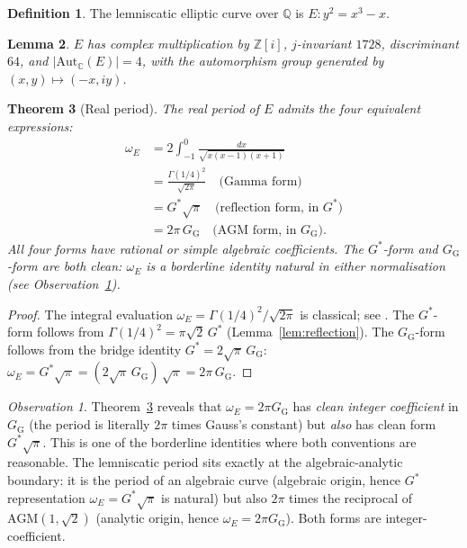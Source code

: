 \documentclass[11pt]{article}
\newtheorem{theorem}{Theorem}[section]
\newtheorem{lemma}[theorem]{Lemma}
\theoremstyle{definition}
\newtheorem{definition}[theorem]{Definition}
\theoremstyle{remark}
\newtheorem*{observation}{Observation}
\newcommand{\Gs}{G^{*}}
\newcommand{\GG}{G_{\!\scriptscriptstyle\mathrm{G}}}
\newcommand{\Z}{\mathbb{Z}}
\newcommand{\Q}{\mathbb{Q}}
\newcommand{\C}{\mathbb{C}}
\newcommand{\AGM}{\mathrm{AGM}}
\newcommand{\Aut}{\mathrm{Aut}}
\begin{document}
\begin{definition}
The lemniscatic elliptic curve over $\Q$ is $E: y^2 = x^3 - x$.
\end{definition}

\begin{lemma}\label{lem:E-properties}
$E$ has complex multiplication by $\Z[i]$, $j$-invariant $1728$, discriminant
$64$, and $|\Aut_\C(E)| = 4$, with the automorphism group generated by
$(x,y) \mapsto (-x, iy)$.
\end{lemma}

\begin{theorem}[Real period]\label{thm:period}
The real period of $E$ admits the four equivalent expressions:
\begin{align}
\omega_E &= 2\int_{-1}^{0} \frac{dx}{\sqrt{x(x-1)(x+1)}} \\
&= \frac{\Gamma(1/4)^2}{\sqrt{2\pi}} \quad \text{(Gamma form)} \\
&= \Gs\sqrt\pi \quad \text{(reflection form, in $\Gs$)} \\
&= 2\pi\,\GG \quad \text{(AGM form, in $\GG$)}.
\end{align}
All four forms have rational or simple algebraic coefficients. The
$\Gs$-form and $\GG$-form are both clean: $\omega_E$ is a borderline
identity natural in either normalisation
(see Observation~\ref{obs:period-borderline}).
\end{theorem}

\begin{proof}
The integral evaluation $\omega_E = \Gamma(1/4)^2/\sqrt{2\pi}$ is classical;
see \cite[\S 2.5]{borweinAGM}. The $\Gs$-form follows from
$\Gamma(1/4)^2 = \pi\sqrt 2\,\Gs$ (Lemma~\ref{lem:reflection}).
The $\GG$-form follows from the bridge identity $\Gs = 2\sqrt\pi\,\GG$:
$\omega_E = \Gs\sqrt\pi = (2\sqrt\pi\,\GG)\,\sqrt\pi = 2\pi\,\GG$.
\end{proof}

\begin{observation}\label{obs:period-borderline}
Theorem~\ref{thm:period} reveals that $\omega_E = 2\pi\GG$ has \emph{clean
integer coefficient} in $\GG$ (the period is literally $2\pi$ times Gauss's
constant) but \emph{also} has clean form $\Gs\sqrt\pi$. This is one of the
borderline identities where both conventions are reasonable. The
lemniscatic period sits exactly at the algebraic-analytic boundary:
it is the period of an algebraic curve (algebraic origin, hence $\Gs$
representation $\omega_E = \Gs\sqrt\pi$ is natural) but also $2\pi$ times
the reciprocal of $\AGM(1, \sqrt 2)$ (analytic origin, hence
$\omega_E = 2\pi\GG$). Both forms are integer-coefficient.
\end{observation}
\end{document}
